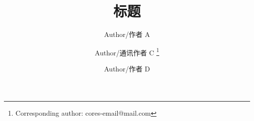 \documentclass[10pt, oneside, a4paper]{article}      %
\title{\hei 标题}
\author[a]{Author/作者 A}   %
\author[a]{Author/通讯作者 C \thanks{Corresponding author: cores-email@mail.com}}     %
\author[b]{Author/作者 D}									     %
\affil[a]{作者单位-1 \authorcr 地址}    %
\affil[b]{作者单位-2}			     %
\date{} %
\begin{document}


\fancyfoot[C]{} %

%
\renewcommand{\abstractname}{\small{\CJKfamily{hei} 摘\quad 要}} %
\renewcommand{\refname}{\centering\CJKfamily{hei} 参考文献}
\renewcommand{\figurename}{{\bf Fig}.}
\renewcommand{\tablename}{{\bf Tab}.}

\makeatletter
\long{}
\makeatother
\end{document}
